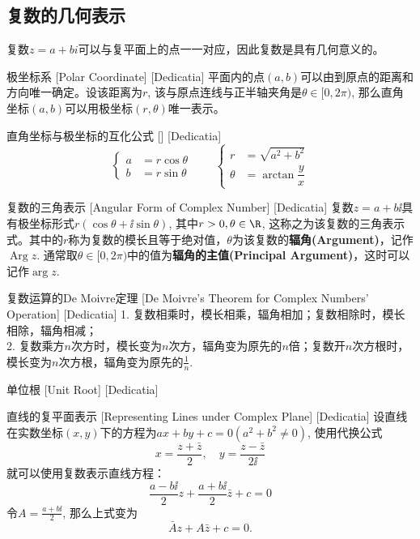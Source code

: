 \documentclass[UTF8]{ctexart}
\begin{document}
\subsection{复数的几何表示}
复数$z=a+bi$可以与复平面上的点一一对应，因此复数是具有几何意义的。
\begin{dfn}
    [UUID]
    {极坐标系}
    [Polar Coordinate]
    [Dedicatia]
    平面内的点$(a,b)$可以由到原点的距离和方向唯一确定。设该距离为$r$, 该与原点连线与正半轴夹角是$\theta\in[0,2\pi)$, 那么直角坐标$(a,b)$可以用极坐标$(r,\theta)$唯一表示。
\end{dfn}
\begin{ppt}
    [UUID]
    {直角坐标与极坐标的互化公式}
    []
    [Dedicatia]
    \[\begin{cases}
        a&=r\cos\theta\\
        b&=r\sin\theta
    \end{cases}\qquad\begin{cases}
        r&=\sqrt{a^2+b^2}\\
        \theta&=\arctan\dfrac{y}{x}
    \end{cases}\]
\end{ppt}
\begin{dfn}
    [AngularForm]
    {复数的三角表示}
    [Angular Form of Complex Number]
    [Dedicatia]
    复数$z=a+b\ii$具有极坐标形式$r(\cos\theta+\ii\sin\theta)$, 其中$r>0, \theta\in\R$, 这称之为该复数的三角表示式。其中的$r$称为复数的模长且等于绝对值，$\theta$为该复数的\textbf{辐角(Argument)}，记作$\operatorname{Arg} z$. 通常取$\theta\in[0,2\pi)$中的值为\textbf{辐角的主值(Principal Argument)}，这时可以记作$\arg{z}$.
\end{dfn}
\begin{thm}
    [UUID]
    {复数运算的De Moivre定理}
    [De Moivre's Theorem for Complex Numbers' Operation]
    [Dedicatia]
    1. 复数相乘时，模长相乘，辐角相加；复数相除时，模长相除，辐角相减；\\
    2. 复数乘方$n$次方时，模长变为$n$次方，辐角变为原先的$n$倍；复数开$n$次方根时，模长变为$n$次方根，辐角变为原先的$\frac{1}{n}$.
\end{thm}
\begin{dfn}
    [UUID]
    {单位根}
    [Unit Root]
    [Dedicatia]
\end{dfn}
\begin{dfn}
    [LineComplexRepresenting]
    {直线的复平面表示}
    [Representing Lines under Complex Plane]
    [Dedicatia]
    设直线在实数坐标$(x,y)$下的方程为$ax+by+c=0(a^2+b^2\neq 0)$, 使用代换公式
    \[x=\frac{z+\bar{z}}{2},\quad y=\frac{z-\bar{z}}{2\ii}\]
    就可以使用复数表示直线方程：
    \[\frac{a-b\ii}{2}z+\frac{a+b\ii}{2}\bar{z}+c=0\]
    令$A=\frac{a+b\ii}{2}$, 那么上式变为
    \[\bar{A}z+A\bar{z}+c=0.\]
\end{dfn}
\end{document}
